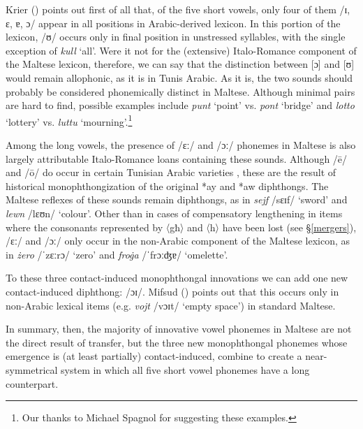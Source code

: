 \documentclass[output=paper]{langsci/langscibook}
\begin{document}
Krier (\citeyear[21]{krier1976}) points out first of all that, of the five short vowels, only four of them /ɪ, ɛ, ɐ, ɔ/ appear in all positions in Arabic-derived lexicon. In this portion of the lexicon, /ʊ/ occurs only in final position in unstressed syllables, with the single exception of \textit{kull} `all'. Were it not for the (extensive) Italo-Romance component of the Maltese lexicon, therefore, we can say that the distinction between [ɔ] and [ʊ] would remain allophonic, as it is in Tunis Arabic. As it is, the two sounds should probably be considered phonemically distinct in Maltese. Although minimal pairs are hard to find, possible examples include \textit{punt} `point' vs. \textit{pont} `bridge' and \textit{lotto} `lottery' vs. \textit{luttu} `mourning'.\footnote{Our thanks to Michael Spagnol for suggesting these examples.}

Among the long vowels, the presence of /ɛː/ and /ɔː/ phonemes in Maltese is also largely attributable Italo-Romance loans containing these sounds. Although /\={e}/ and /\={o}/ do occur in certain Tunisian Arabic varieties \citep{Gibson2011,HerinZammit2017}, these are the result of historical monophthongization of the original *ay and *aw diphthongs. The Maltese reflexes of these sounds remain diphthongs, as in \textit{sejf} /sɛɪf/ `sword' and \textit{lewn} /lɛʊn/ `colour'. Other than in cases of compensatory lengthening in items where the consonants represented by 〈għ〉 and 〈h〉 have been lost (see §\ref{mergers}), /ɛː/ and /ɔː/ only occur in the non-Arabic component of the Maltese lexicon, as in \textit{żero} /ˈzɛːrɔ/ `zero' and \textit{froġa} /ˈfrɔːʤɐ/ `omelette'. 

To these three contact-induced monophthongal innovations we can add one new contact-induced diphthong: /ɔɪ/. Mifsud (\citeyear{mifsud2011}) points out that this occurs only in non-Arabic lexical items (e.g. \textit{vojt} /vɔɪt/ `empty space') in standard Maltese.

In summary, then, the majority of innovative vowel phonemes in Maltese are not the direct result of transfer, but the three new monophthongal phonemes whose emergence is (at least partially) contact-induced, combine to create a near-symmetrical system in which all five short vowel phonemes have a long counterpart.
\end{document}
